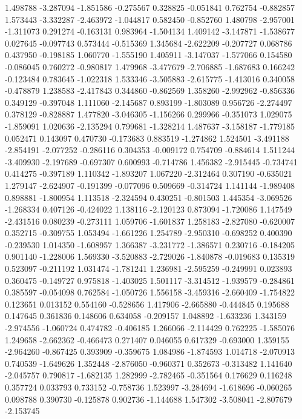 1.498788
-3.287094
-1.851586
-0.275567
0.328825
-0.051841
0.762754
-0.882857
1.573443
-3.332287
-2.463972
-1.044817
0.582450
-0.852760
1.480798
-2.957001
-1.311073
0.291274
-0.163131
0.983964
-1.504134
1.409142
-3.147871
-1.538677
0.027645
-0.097743
0.573444
-0.515369
1.345684
-2.622209
-0.207727
0.068786
0.437950
-0.198185
1.060770
-1.555190
1.405911
-3.147037
-1.577066
0.154580
-0.086045
0.760272
-0.980817
1.479968
-3.477679
-2.706885
-1.687683
0.166242
-0.123484
0.783645
-1.022318
1.533346
-3.505883
-2.615775
-1.413016
0.340058
-0.478879
1.238583
-2.417843
0.344860
-0.862569
1.358260
-2.992962
-0.856336
0.349129
-0.397048
1.111060
-2.145687
0.893199
-1.803089
0.956726
-2.274497
0.378129
-0.828887
1.477820
-3.046305
-1.156266
0.299966
-0.351073
1.029075
-1.859091
1.020636
-2.135294
0.799681
-1.328214
1.487637
-3.158187
-1.779185
0.052471
0.143097
0.470730
-0.173683
0.883519
-1.274862
1.524501
-3.491188
-2.854191
-2.077252
-0.286116
0.304353
-0.009172
0.754709
-0.884614
1.511244
-3.409930
-2.197689
-0.697307
0.600993
-0.714786
1.456382
-2.915445
-0.734741
0.414275
-0.397189
1.110342
-1.893207
1.067220
-2.312464
0.307190
-0.635021
1.279147
-2.624907
-0.191399
-0.077096
0.509669
-0.314724
1.141144
-1.989408
0.898881
-1.800954
1.113518
-2.324594
0.430251
-0.801503
1.445354
-3.069526
-1.268334
0.407126
-0.424022
1.138116
-2.120123
0.873094
-1.720086
1.147549
-2.431516
0.080239
-0.273111
1.059706
-1.601837
1.258183
-2.827080
-0.620007
0.352715
-0.309755
1.053494
-1.661226
1.254789
-2.950310
-0.698252
0.400390
-0.239530
1.014350
-1.608957
1.366387
-3.231772
-1.386571
0.230716
-0.184205
0.901140
-1.228006
1.569330
-3.520883
-2.729026
-1.840878
-0.019683
0.135319
0.523097
-0.211192
1.031474
-1.781241
1.236981
-2.595259
-0.249991
0.023893
0.360475
-0.149727
0.975818
-1.403025
1.501117
-3.314512
-1.939579
-0.284861
0.385597
-0.054098
0.762584
-1.050726
1.556158
-3.459316
-2.660409
-1.754822
0.123651
0.013152
0.554160
-0.528656
1.417906
-2.665880
-0.444845
0.195688
0.147645
0.361836
0.148606
0.634058
-0.209157
1.048892
-1.633236
1.343159
-2.974556
-1.060724
0.474782
-0.406185
1.266066
-2.114429
0.762225
-1.585076
1.249658
-2.662362
-0.466473
0.271407
0.046055
0.617329
-0.693000
1.359155
-2.964260
-0.867425
0.393909
-0.359675
1.084986
-1.874593
1.014718
-2.070913
0.740539
-1.649626
1.352448
-2.876050
-0.960371
0.352673
-0.313482
1.141640
-2.045757
0.790817
-1.682135
1.282999
-2.782465
-0.351564
0.176629
0.116248
0.357724
0.033793
0.733152
-0.758736
1.523997
-3.284694
-1.618696
-0.060265
0.098788
0.390730
-0.125878
0.902736
-1.144688
1.547302
-3.508041
-2.807679
-2.153745
